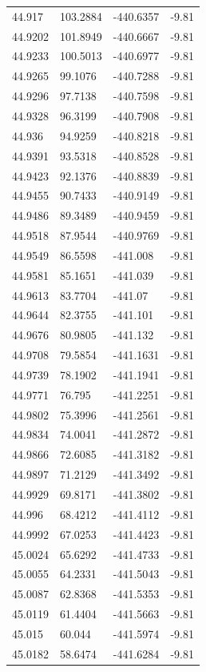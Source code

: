 \begin{table}[H]
\begin{tabular}{llll}
44.917 & 103.2884 & -440.6357 & -9.81 \\
44.9202 & 101.8949 & -440.6667 & -9.81 \\
44.9233 & 100.5013 & -440.6977 & -9.81 \\
44.9265 & 99.1076 & -440.7288 & -9.81 \\
44.9296 & 97.7138 & -440.7598 & -9.81 \\
44.9328 & 96.3199 & -440.7908 & -9.81 \\
44.936 & 94.9259 & -440.8218 & -9.81 \\
44.9391 & 93.5318 & -440.8528 & -9.81 \\
44.9423 & 92.1376 & -440.8839 & -9.81 \\
44.9455 & 90.7433 & -440.9149 & -9.81 \\
44.9486 & 89.3489 & -440.9459 & -9.81 \\
44.9518 & 87.9544 & -440.9769 & -9.81 \\
44.9549 & 86.5598 & -441.008 & -9.81 \\
44.9581 & 85.1651 & -441.039 & -9.81 \\
44.9613 & 83.7704 & -441.07 & -9.81 \\
44.9644 & 82.3755 & -441.101 & -9.81 \\
44.9676 & 80.9805 & -441.132 & -9.81 \\
44.9708 & 79.5854 & -441.1631 & -9.81 \\
44.9739 & 78.1902 & -441.1941 & -9.81 \\
44.9771 & 76.795 & -441.2251 & -9.81 \\
44.9802 & 75.3996 & -441.2561 & -9.81 \\
44.9834 & 74.0041 & -441.2872 & -9.81 \\
44.9866 & 72.6085 & -441.3182 & -9.81 \\
44.9897 & 71.2129 & -441.3492 & -9.81 \\
44.9929 & 69.8171 & -441.3802 & -9.81 \\
44.996 & 68.4212 & -441.4112 & -9.81 \\
44.9992 & 67.0253 & -441.4423 & -9.81 \\
45.0024 & 65.6292 & -441.4733 & -9.81 \\
45.0055 & 64.2331 & -441.5043 & -9.81 \\
45.0087 & 62.8368 & -441.5353 & -9.81 \\
45.0119 & 61.4404 & -441.5663 & -9.81 \\
45.015 & 60.044 & -441.5974 & -9.81 \\
45.0182 & 58.6474 & -441.6284 & -9.81 \\

\end{tabular}
\end{table}
